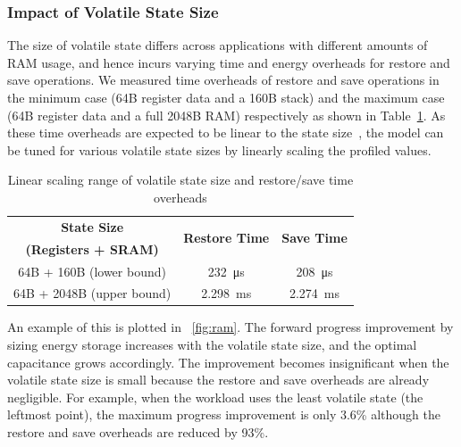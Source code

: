 \subsubsection{Impact of Volatile State Size}

The size of volatile state differs across applications with different amounts of RAM usage, and hence incurs varying time and energy overheads for restore and save operations. We measured time overheads of restore and save operations in the minimum case (64B register data and a 160B stack) and the maximum case (64B register data and a full 2048B RAM) respectively as shown in Table~\ref{tab:ramscale}. As these time overheads are expected to be linear to the state size~\cite{sliper2019efficient}, the model can be tuned for various volatile state sizes by linearly scaling the profiled values. 


\begin{table}[!t]
    \renewcommand{\arraystretch}{1.2}
    \centering
    \caption{Linear scaling range of volatile state size and restore/save time overheads}
    \label{tab:ramscale}
    \begin{tabular}{|c|cc|}
    \hline
    \textbf{State Size} & \multirow{2}{*}{\textbf{Restore Time}} & \multirow{2}{*}{\textbf{Save Time}}\\
    \textbf{(Registers + SRAM)} & & \\
    \hline
    64B + 160B (lower bound) & \SI{232}{\micro\second} & \SI{208}{\micro\second}\\
    64B + 2048B (upper bound) & \SI{2.298}{\milli\second} & \SI{2.274}{\milli\second} \\
    \hline
    \end{tabular}
\end{table}

An example of this is plotted in \figurename{~\ref{fig:ram}}. The forward progress improvement by sizing energy storage increases with the volatile state size, and the optimal capacitance grows accordingly. The improvement becomes insignificant when the volatile state size is small because the restore and save overheads are already negligible. For example, when the workload uses the least volatile state (the leftmost point), the maximum progress improvement is only 3.6\% although the restore and save overheads are reduced by 93\%. 

